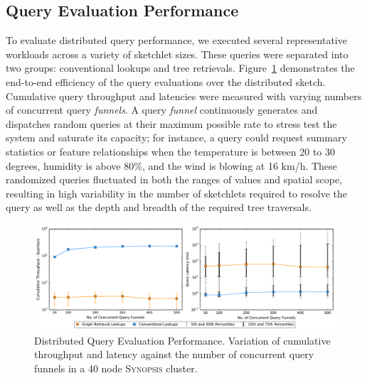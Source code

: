 \subsection{Query Evaluation Performance}
To evaluate distributed query performance, we executed several representative workloads across a variety of sketchlet sizes. These queries were separated into two groups: conventional lookups and tree retrievals.  Figure~\ref{fig:dist-query} demonstrates the end-to-end efficiency of the query evaluations over the distributed sketch.
Cumulative query throughput and latencies were measured with varying numbers of concurrent query \emph{funnels}.
A query \emph{funnel} continuously generates and dispatches random queries at their maximum possible rate to stress test the system and saturate its capacity; for instance, a query could request summary statistics or feature relationships when the temperature is between 20 to 30 degrees, humidity is above 80\%, and the wind is blowing at 16 km/h.
These randomized queries fluctuated in both the ranges of values and spatial scope, resulting in high variability in the number of sketchlets required to resolve the query as well as the depth and breadth of the required tree traversals.

\begin{figure}
    \centerline{\includegraphics[width=\linewidth]{figures/query_benchmark_both.pdf}}
    \caption{Distributed Query Evaluation Performance. Variation of cumulative throughput and latency against the number of concurrent query funnels in a 40 node \textsc{Synopsis} cluster.}
    \label{fig:dist-query}
\end{figure}




